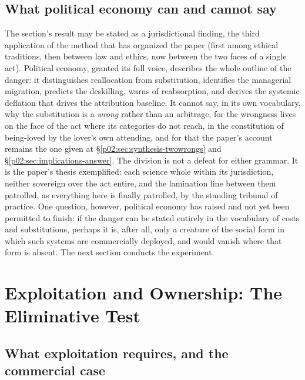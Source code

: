 \subsection{What political economy can and cannot say}
\label{p02:sec:pe-verdict}

The section's result may be stated as a jurisdictional finding, the third application of the method that has organized the paper (first among ethical traditions, then between law and ethics, now between the two faces of a single act). Political economy, granted its full voice, describes the whole outline of the danger: it distinguishes reallocation from substitution, identifies the managerial migration, predicts the deskilling, warns of reabsorption, and derives the systemic deflation that drives the attribution baseline. It cannot say, in its own vocabulary, why the substitution is a \emph{wrong} rather than an arbitrage, for the wrongness lives on the face of the act where its categories do not reach, in the constitution of being-loved by the lover's own attending, and for that the paper's account remains the one given at \S\ref{p02:sec:synthesis-twowrongs} and \S\ref{p02:sec:implications-answer}. The division is not a defeat for either grammar. It is the paper's thesis exemplified: each science whole within its jurisdiction, neither sovereign over the act entire, and the lamination line between them patrolled, as everything here is finally patrolled, by the standing tribunal of practice. One question, however, political economy has raised and not yet been permitted to finish: if the danger can be stated entirely in the vocabulary of costs and substitutions, perhaps it is, after all, only a creature of the social form in which such systems are commercially deployed, and would vanish where that form is absent. The next section conducts the experiment.

\section{Exploitation and Ownership: The Eliminative Test}
\label{p02:sec:exploitation}

\subsection{What exploitation requires, and the commercial case}
\label{p02:sec:ex-structure}

